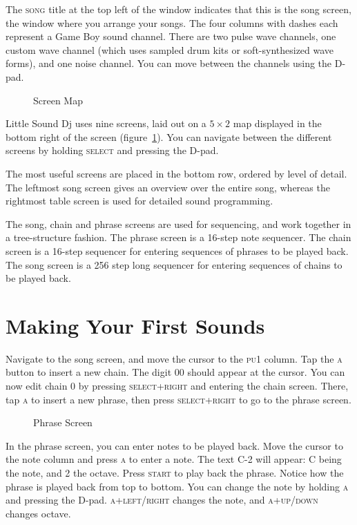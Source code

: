 The \textsc{song} title at the top left of the window indicates that this is the song screen, the
window where you arrange your songs. The four columns with dashes each represent a
Game Boy sound channel. There are two pulse wave channels, one custom wave channel
(which uses sampled drum kits or soft-synthesized wave forms), and one noise channel. You
can move between the channels using the D-pad.

\begin{figure}[hbtp]
\centering
{}
\caption{Screen Map}
\label{fig:map}
\end{figure}

Little Sound Dj uses nine screens, laid out on a \begin{math} 5 \times 2 \end{math} map displayed in the
bottom right of the screen (figure~\ref{fig:map}). You can navigate between the different screens by
holding \textsc{select} and pressing the D-pad.

The most useful screens are placed in the bottom row, ordered by level of detail. The leftmost song screen
gives an overview over the entire song, whereas the rightmost table screen is used for detailed sound programming. 

The song, chain and phrase screens are used for sequencing, and work together in a tree-structure
fashion. The phrase screen is a 16-step note sequencer.
The chain screen is a 16-step sequencer for entering sequences of phrases to
be played back. The song screen is a 256 step long sequencer for entering sequences of
chains to be played back.

\section{Making Your First Sounds}
Navigate to the song screen, and move the cursor to the \textsc{pu1} column. Tap the \textsc{a} button
to insert a new chain. The digit 00 should appear at the cursor. You can now edit chain 0 by pressing \textsc{select+right} and entering the chain screen. There, tap \textsc{a} to insert a new phrase, then press \textsc{select+right} to go to the
phrase screen.

\begin{figure}[hbtp]
\centering
{}
\caption{Phrase Screen}
\label{fig:phrase1}
\end{figure}

In the phrase screen, you can enter notes to be played back. Move the cursor to the note
column and press \textsc{a} to enter a note. The text C-2 will appear: C being the note, and 2 the
octave. Press \textsc{start} to play back the phrase. Notice how the phrase is played back from
top to bottom. You can change the note by holding \textsc{a} and pressing the
D-pad. \textsc{a+left/right} changes the note, and \textsc{a+up/down} changes octave.

